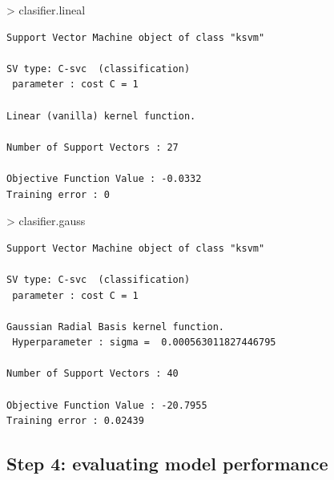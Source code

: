 \documentclass[
]{article}
\newenvironment{Shaded}{\begin{snugshade}}{\end{snugshade}}
\newcommand{\FunctionTok}[1]{\textcolor[rgb]{0.94,0.94,0.56}{#1}}
\newcommand{\NormalTok}[1]{\textcolor[rgb]{0.80,0.80,0.80}{#1}}
\newcommand{\OtherTok}[1]{\textcolor[rgb]{0.94,0.94,0.56}{#1}}
\newcommand{\SpecialCharTok}[1]{\textcolor[rgb]{0.86,0.64,0.64}{#1}}
\begin{document}
\begin{Shaded}
\begin{Highlighting}[]
\SpecialCharTok{\textgreater{}}\NormalTok{ clasifier.lineal}
\end{Highlighting}
\end{Shaded}

\begin{verbatim}
Support Vector Machine object of class "ksvm" 

SV type: C-svc  (classification) 
 parameter : cost C = 1 

Linear (vanilla) kernel function. 

Number of Support Vectors : 27 

Objective Function Value : -0.0332 
Training error : 0 
\end{verbatim}

\begin{Shaded}
\begin{Highlighting}[]
\SpecialCharTok{\textgreater{}}\NormalTok{ clasifier.gauss}
\end{Highlighting}
\end{Shaded}

\begin{verbatim}
Support Vector Machine object of class "ksvm" 

SV type: C-svc  (classification) 
 parameter : cost C = 1 

Gaussian Radial Basis kernel function. 
 Hyperparameter : sigma =  0.000563011827446795 

Number of Support Vectors : 40 

Objective Function Value : -20.7955 
Training error : 0.02439 
\end{verbatim}

\hypertarget{step-4-evaluating-model-performance}{%
\subsection{Step 4: evaluating model
performance}\label{step-4-evaluating-model-performance}}

\begin{Shaded}
\end{Shaded}
\end{document}
